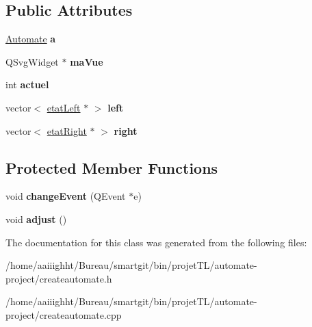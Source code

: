 \subsection*{Public Attributes}
\begin{DoxyCompactItemize}
\item 
\hypertarget{class_create_automate_a00809917dbe83828485789bf25725964}{\hyperlink{class_automate}{Automate} {\bfseries a}}\label{class_create_automate_a00809917dbe83828485789bf25725964}

\item 
\hypertarget{class_create_automate_a67da1a6995daa455a00771c099358a89}{Q\-Svg\-Widget $\ast$ {\bfseries ma\-Vue}}\label{class_create_automate_a67da1a6995daa455a00771c099358a89}

\item 
\hypertarget{class_create_automate_a599db4453047381fcd0d48dfb185da82}{int {\bfseries actuel}}\label{class_create_automate_a599db4453047381fcd0d48dfb185da82}

\item 
\hypertarget{class_create_automate_a368e5fd06e6bafb6a297cb7d32d90655}{vector$<$ \hyperlink{classetat_left}{etat\-Left} $\ast$ $>$ {\bfseries left}}\label{class_create_automate_a368e5fd06e6bafb6a297cb7d32d90655}

\item 
\hypertarget{class_create_automate_a8471078665ab7f4daf858c81f35496ac}{vector$<$ \hyperlink{classetat_right}{etat\-Right} $\ast$ $>$ {\bfseries right}}\label{class_create_automate_a8471078665ab7f4daf858c81f35496ac}

\end{DoxyCompactItemize}
\subsection*{Protected Member Functions}
\begin{DoxyCompactItemize}
\item 
\hypertarget{class_create_automate_acae0d3eabf60d2ae32f75ad11aa59be6}{void {\bfseries change\-Event} (Q\-Event $\ast$e)}\label{class_create_automate_acae0d3eabf60d2ae32f75ad11aa59be6}

\item 
\hypertarget{class_create_automate_aad4103629c0487ca511f43502c290be0}{void {\bfseries adjust} ()}\label{class_create_automate_aad4103629c0487ca511f43502c290be0}

\end{DoxyCompactItemize}


The documentation for this class was generated from the following files\-:\begin{DoxyCompactItemize}
\item 
/home/aaiiighht/\-Bureau/smartgit/bin/projet\-T\-L/automate-\/project/createautomate.\-h\item 
/home/aaiiighht/\-Bureau/smartgit/bin/projet\-T\-L/automate-\/project/createautomate.\-cpp\end{DoxyCompactItemize}
